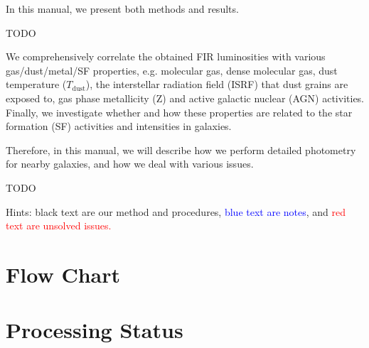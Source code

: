 \documentclass[11pt,a4paper]{article}
\begin{document}
In this manual, we present both methods and results. 

TODO

We comprehensively correlate the obtained FIR luminosities with various gas/dust/metal/SF properties, e.g. molecular gas, dense molecular gas, dust temperature ($T_{\mathrm{dust}}$), the interstellar radiation field (ISRF) that dust grains are exposed to, gas phase metallicity (Z) and active galactic nuclear (AGN) activities. Finally, we investigate whether and how these properties are related to the star formation (SF) activities and intensities in galaxies. 

Therefore, in this manual, we will describe how we perform detailed photometry for nearby galaxies, and how we deal with various issues. 

TODO



\vspace{5cm}
Hints: black text are our method and procedures, \textcolor{blue}{blue text are notes}, and \textcolor{red}{red text are unsolved issues.}


\clearpage

\section{Flow Chart}
\label{FlowChart}



\clearpage

\section{Processing Status}
\label{ProcessingStatus}

\end{document}

